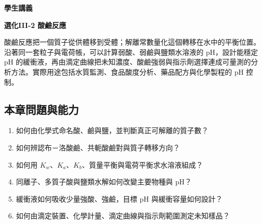 \documentclass[11pt,a4paper]{article}
\providecommand{\tightlist}{%
  \setlength{\itemsep}{0pt}\setlength{\parskip}{0pt}}
\begin{document}
\begin{tcolorbox}[
  enhanced,colback=white,colframe=HandoutBlue,boxrule=1.1pt,arc=2mm,
  borderline west={3pt}{0pt}{HandoutBlue},left=5mm,right=4mm,top=4mm,bottom=4mm
]
{\sffamily\small\bfseries\color{HandoutBlue}學生講義}\par
{\sffamily\bfseries\LARGE\color{HandoutInk}選化III-2 酸鹼反應}\par
\vspace{0.35em}{\large 由質子轉移與解離平衡，定量連結水解、緩衝、滴定曲線與酸鹼分析}\par
{}\par
{}\par
\end{tcolorbox}


酸鹼反應把一個質子從供體移到受體；解離常數量化這個轉移在水中的平衡位置。沿著同一套粒子與電荷帳，可以計算弱酸、弱鹼與鹽類水溶液的 pH，設計能穩定 pH 的緩衝液，再由滴定曲線把未知濃度、酸鹼強弱與指示劑選擇連成可量測的分析方法。實際用途包括水質監測、食品酸度分析、藥品配方與化學製程的 pH 控制。

\begin{HandoutLearningMap}

\subsection{本章問題與能力}\label{ux672cux7ae0ux554fux984cux8207ux80fdux529b}

\begin{enumerate}
\def\labelenumi{\arabic{enumi}.}
\tightlist
\item
  如何由化學式命名酸、鹼與鹽，並判斷真正可解離的質子數？
\item
  如何辨認布－洛酸鹼、共軛酸鹼對與質子轉移方向？
\item
  如何用 \(K_w\)、\(K_a\)、\(K_b\)、質量平衡與電荷平衡求水溶液組成？
\item
  同離子、多質子酸與鹽類水解如何改變主要物種與 pH？
\item
  緩衝液如何吸收少量強酸、強鹼，目標 pH 與緩衝容量如何設計？
\item
  如何由滴定裝置、化學計量、滴定曲線與指示劑範圍測定未知樣品？
\end{enumerate}

\end{HandoutLearningMap}
\end{document}
